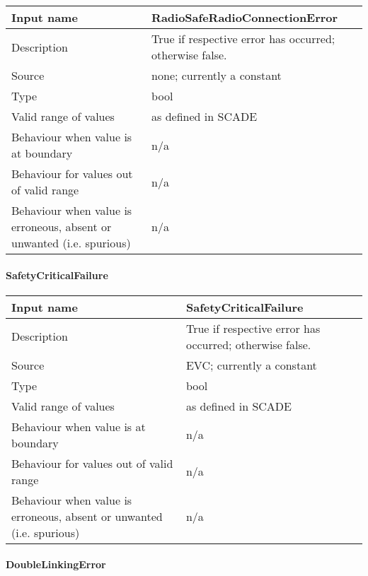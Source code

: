 \begin{longtable}{p{}p{}}
\toprule
Input name				& RadioSafeRadioConnectionError \\
\midrule
Description				& True if respective error has occurred; otherwise false. \\
\midrule
Source					& none; currently a constant \\ 
\midrule
Type					& bool \\
\midrule
Valid range of values	& as defined in SCADE \\
\midrule
Behaviour when value is at boundary	& n/a \\
\midrule
Behaviour for values out of valid range	& n/a \\
\midrule
Behaviour when value is erroneous, absent or unwanted (i.e. spurious) & n/a \\
\bottomrule
\end{longtable}

\paragraph{SafetyCriticalFailure}

\begin{longtable}{p{}p{}}
\toprule
Input name				& SafetyCriticalFailure \\
\midrule
Description				& True if respective error has occurred; otherwise false. \\
\midrule
Source					& EVC; currently a constant \\ 
\midrule
Type					& bool \\
\midrule
Valid range of values	& as defined in SCADE \\
\midrule
Behaviour when value is at boundary	& n/a \\
\midrule
Behaviour for values out of valid range	& n/a \\
\midrule
Behaviour when value is erroneous, absent or unwanted (i.e. spurious) & n/a \\
\bottomrule
\end{longtable}

\paragraph{DoubleLinkingError}

